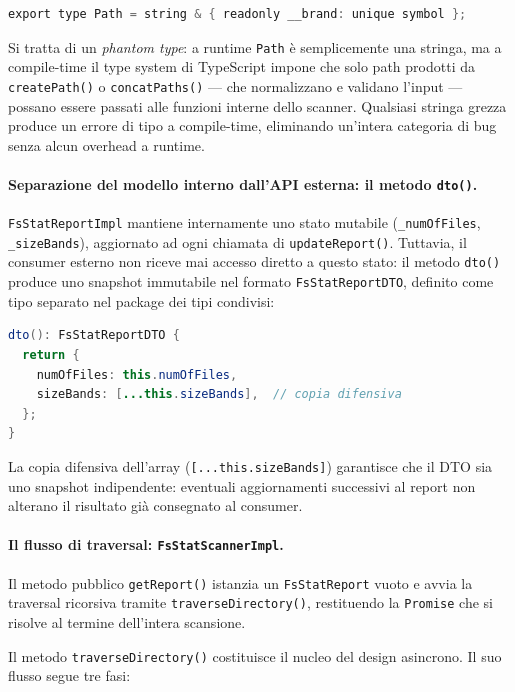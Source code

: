 \documentclass[11pt,a4paper]{article}
\begin{document}
\begin{lstlisting}[language=Java]
export type Path = string & { readonly __brand: unique symbol };
\end{lstlisting}

Si tratta di un \textit{phantom type}: a runtime \texttt{Path} è semplicemente una stringa, ma a compile-time il type system di TypeScript impone che solo path prodotti da \texttt{createPath()} o \texttt{concatPaths()} — che normalizzano e validano l'input — possano essere passati alle funzioni interne dello scanner. Qualsiasi stringa grezza produce un errore di tipo a compile-time, eliminando un'intera categoria di bug senza alcun overhead a runtime.

\paragraph{Separazione del modello interno dall'API esterna: il metodo \texttt{dto()}.}

\texttt{FsStatReportImpl} mantiene internamente uno stato mutabile (\texttt{\_numOfFiles}, \texttt{\_sizeBands}), aggiornato ad ogni chiamata di \texttt{updateReport()}. Tuttavia, il consumer esterno non riceve mai accesso diretto a questo stato: il metodo \texttt{dto()} produce uno snapshot immutabile nel formato \texttt{FsStatReportDTO}, definito come tipo separato nel package dei tipi condivisi:

\begin{lstlisting}[language=Java]
dto(): FsStatReportDTO {
  return {
    numOfFiles: this.numOfFiles,
    sizeBands: [...this.sizeBands],  // copia difensiva
  };
}
\end{lstlisting}

La copia difensiva dell'array (\texttt{[...this.sizeBands]}) garantisce che il DTO sia uno snapshot indipendente: eventuali aggiornamenti successivi al report non alterano il risultato già consegnato al consumer.

\paragraph{Il flusso di traversal: \texttt{FsStatScannerImpl}.}

Il metodo pubblico \texttt{getReport()} istanzia un \texttt{FsStatReport} vuoto e avvia la traversal ricorsiva tramite \texttt{traverseDirectory()}, restituendo la \texttt{Promise} che si risolve al termine dell'intera scansione.

Il metodo \texttt{traverseDirectory()} costituisce il nucleo del design asincrono. Il suo flusso segue tre fasi:
\end{document}
